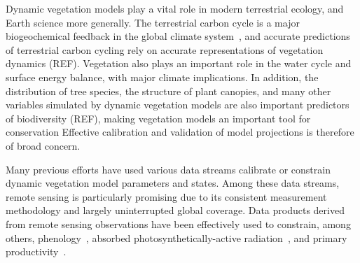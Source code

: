 \introduction  %

Dynamic vegetation models play a vital role in modern terrestrial ecology, and Earth science more generally.
The terrestrial carbon cycle is a major biogeochemical feedback in the global climate system~\citep{heinze_2019_esd_reviews}, and accurate predictions of terrestrial carbon cycling rely on accurate representations of vegetation dynamics (REF). %
Vegetation also plays an important role in the water cycle and surface energy balance, with major climate implications.
In addition, the distribution of tree species, the structure of plant canopies, and many other variables simulated by dynamic vegetation models are also important predictors of biodiversity (REF), making vegetation models an important tool for conservation %
Effective calibration and validation of model projections is therefore of broad concern.


Many previous efforts have used various data streams calibrate or constrain dynamic vegetation model parameters and states.
Among these data streams, remote sensing is particularly promising due to its consistent measurement methodology and largely uninterrupted global coverage.
Data products derived from remote sensing observations have been effectively used to constrain, among others,
phenology~\citep{knorr2010carbon, viskari2015modeldata},
absorbed photosynthetically-active radiation~\citep{peylin2016new, schurmann2016constraining},
and primary productivity~\citep{macbean2018strong}.

